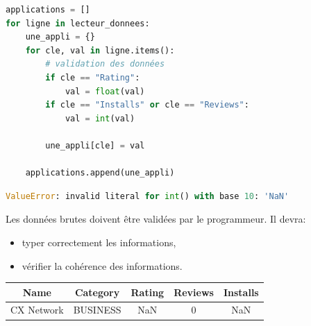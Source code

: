 \documentclass[svgnames,11pt]{beamer}
\begin{document}
\begin{frame}[fragile]

    \begin{center}
        \begin{lstlisting}[language=Python, basicstyle=\ttfamily\small, xleftmargin=1em, xrightmargin=1em]
applications = []
for ligne in lecteur_donnees:
    une_appli = {}
    for cle, val in ligne.items():
        # validation des données
        if cle == "Rating":
            val = float(val)
        if cle == "Installs" or cle == "Reviews":
            val = int(val)

        une_appli[cle] = val

    applications.append(une_appli)
\end{lstlisting}
\begin{lstlisting}[language=Python , basicstyle=\ttfamily\small, xleftmargin=0.3em, xrightmargin=-3em]
ValueError: invalid literal for int() with base 10: 'NaN'
\end{lstlisting}
\label{CODE}
\end{center}
\end{frame}
\begin{frame}
\begin{aretenir}[]
Les données brutes doivent être validées par le programmeur. Il devra:
\begin{itemize}
    \item typer correctement les informations,
    \item vérifier la cohérence des informations.
\end{itemize}
\end{aretenir}
    \begin{center}
        \begin{tabular}{|*{5}{c|}}
            \hline
            Name       & Category & Rating & Reviews & Installs \\
            \hline
            CX Network & BUSINESS & NaN    & 0       & NaN      \\
            \hline
        \end{tabular}
    \end{center}
\end{frame}
\end{document}
